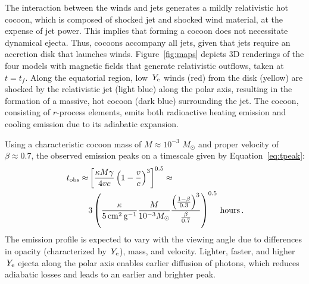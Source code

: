 \documentclass[twocolumn,dvipsnames]{aastex62}
\newcommand{\tobs}{\,{t_{\rm obs}}}
\newcommand{\msun}{\,{M_{\odot}}}
\newcommand{\Ye}{\,{Y_{\rm e}}}
\begin{document}
The interaction between the winds and jets generates a mildly relativistic hot cocoon, which is composed of shocked jet and shocked wind material, at the expense of jet power. This implies that forming a cocoon does not necessitate dynamical ejecta. Thus, cocoons accompany all jets, given that jets require an accretion disk that launches winds.
Figure~\ref{fig:maps} depicts 3D renderings of the four models with magnetic fields that generate relativistic outflows, taken at $ t = t_f $. Along the equatorial region, low $ \Ye $ winds (red) from the disk (yellow) are shocked by the relativistic jet (light blue) along the polar axis, resulting in the formation of a massive, hot cocoon (dark blue) surrounding the jet. The cocoon, consisting of $r$-process elements, emits both radioactive heating emission and cooling emission due to its adiabatic expansion.

Using a characteristic cocoon mass of $ M \approx 10^{-3}\,\msun$ and proper velocity of $\beta \approx 0.7 $, the observed emission peaks on a timescale given by Equation~\eqref{eq:tpeak}:
\begin{equation}\label{eq:time}
\begin{split}
\tobs \approx &\left[\frac{\kappa M \gamma}{4 v c}\left(1-\frac{v}{c}\right)^3\right]^{0.5} \approx \\ & 3\left(\frac{\kappa}{{\rm 5\,cm^2\,g^{-1}}}\frac{M}{10^{-3}M_\odot}\frac{\left(\frac{1-\beta}{0.3}\right)^3}{\frac{\beta}{0.7}}\right)^{0.5}\,{\rm hours}\,.
\end{split}
\end{equation}
The emission profile is expected to vary with the viewing angle due to differences in opacity (characterized by $\Ye$), mass, and velocity. Lighter, faster, and higher $ \Ye $ ejecta along the polar axis enables earlier diffusion of photons, which reduces adiabatic losses and leads to an earlier and brighter peak.
\end{document}
